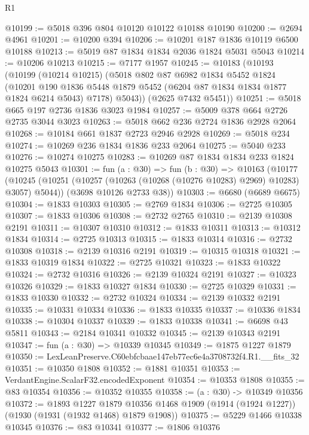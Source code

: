 \begin{lexlean}{R1}
\begin{coremodule}
@10199 := @5018 @396 @804 @10120 @10122 @10188 @10190
@10200 := @2694 @4961
@10201 := @10200 @394
@10206 := @10201 @187 @1836 @10119 @6500 @10188
@10213 := @5019 @87 @1834 @1834 @2036 @1824 @5031 @5043
@10214 := @10206 @10213
@10215 := @7177 @1957
@10245 := @10183
    (@10193
      (@10199
        (@10214 @10215)
        (@5018
          @802
          @87
          @6982
          @1834
          @5452
          @1824
          (@10201
            @190
            @1836
            @5448
            @1879
            @5452
            (@6204 @87 @1834 @1834 @1877 @1824 @6214 @5043)
            @7178)
          @5043))
      (@2625 @7432 @5451))
@10251 := @5018 @665 @197 @2736 @1836 @3023 @1984
@10257 := @5009 @378 @664 @2726 @2735 @3044 @3023
@10263 := @5018 @662 @236 @2724 @1836 @2928 @2064
@10268 := @10184 @661 @1837 @2723 @2946 @2928
@10269 := @5018 @234
@10274 := @10269 @236 @1834 @1836 @233 @2064
@10275 := @5040 @233
@10276 := @10274 @10275
@10283 := @10269 @87 @1834 @1834 @233 @1824 @10275 @5043
@10301 := fun (a : @30) =>
  fun (b : @30) =>
  @10163
    (@10177
      (@10245 (@10251 (@10257 (@10263 (@10268 (@10276 @10283) @2969) @10283) @3057) @5044))
      (@3698 @10126 @2733 @38))
@10303 := @6680 (@6689 @6675)
@10304 := @1833 @10303
@10305 := @2769 @1834
@10306 := @2725 @10305
@10307 := @1833 @10306
@10308 := @2732 @2765
@10310 := @2139 @10308 @2191
@10311 := @10307 @10310
@10312 := @1833 @10311
@10313 := @10312 @1834
@10314 := @2725 @10313
@10315 := @1833 @10314
@10316 := @2732 @10308
@10318 := @2139 @10316 @2191
@10319 := @10315 @10318
@10321 := @1833 @10319 @1834
@10322 := @2725 @10321
@10323 := @1833 @10322
@10324 := @2732 @10316
@10326 := @2139 @10324 @2191
@10327 := @10323 @10326
@10329 := @1833 @10327 @1834
@10330 := @2725 @10329
@10331 := @1833 @10330
@10332 := @2732 @10324
@10334 := @2139 @10332 @2191
@10335 := @10331 @10334
@10336 := @1833 @10335
@10337 := @10336 @1834
@10338 := @10304 @10337
@10339 := @1833 @10338
@10341 := @6698 @43 @5811
@10343 := @2184 @10341 @10332
@10345 := @2139 @10343 @2191
@10347 := fun (a : @30) => @10339 @10345
@10349 := @1875 @1227 @1879
@10350 := LexLeanPreserve.C60ebfcbaae147eb77ec6e4a3708732f4.R1.__fits_32
@10351 := @10350 @1808
@10352 := @1881 @10351
@10353 := VerdantEngine.ScalarF32.encodedExponent
@10354 := @10353 @1808
@10355 := @83 @10354
@10356 := @10352 @10355
@10358 := (a : @30) -> @10349 @10356
@10372 := @1893
    @1227
    @1879
    @10356
    @1468
    @1909
    (@1914 (@1924 @1227))
    (@1930 (@1931 (@1932 @1468) @1879 @1908))
@10375 := @5229 @1466 @10338 @10345
@10376 := @83 @10341
@10377 := @1806 @10376

\end{coremodule}
\end{lexlean}
